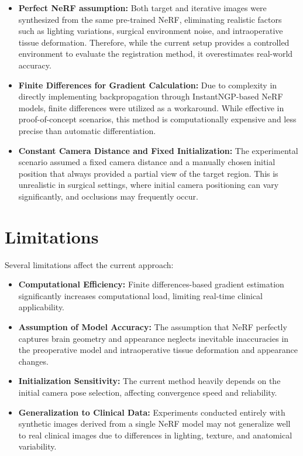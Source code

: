 \begin{itemize}
    \item \textbf{Perfect NeRF assumption:} Both target and iterative images were synthesized from the same pre-trained NeRF, eliminating realistic factors such as lighting variations, surgical environment noise, and intraoperative tissue deformation. Therefore, while the current setup provides a controlled environment to evaluate the registration method, it overestimates real-world accuracy.
    
    \item \textbf{Finite Differences for Gradient Calculation:} Due to complexity in directly implementing backpropagation through InstantNGP-based NeRF models, finite differences were utilized as a workaround. While effective in proof-of-concept scenarios, this method is computationally expensive and less precise than automatic differentiation.
    
    \item \textbf{Constant Camera Distance and Fixed Initialization:} The experimental scenario assumed a fixed camera distance and a manually chosen initial position that always provided a partial view of the target region. This is unrealistic in surgical settings, where initial camera positioning can vary significantly, and occlusions may frequently occur.
\end{itemize}

\section{Limitations}\label{sec:limitations}

Several limitations affect the current approach:

\begin{itemize}
    \item \textbf{Computational Efficiency:} Finite differences-based gradient estimation significantly increases computational load, limiting real-time clinical applicability.

    \item \textbf{Assumption of Model Accuracy:} The assumption that NeRF perfectly captures brain geometry and appearance neglects inevitable inaccuracies in the preoperative model and intraoperative tissue deformation and appearance changes.

    \item \textbf{Initialization Sensitivity:} The current method heavily depends on the initial camera pose selection, affecting convergence speed and reliability.

    \item \textbf{Generalization to Clinical Data:} Experiments conducted entirely with synthetic images derived from a single NeRF model may not generalize well to real clinical images due to differences in lighting, texture, and anatomical variability.
\end{itemize}

